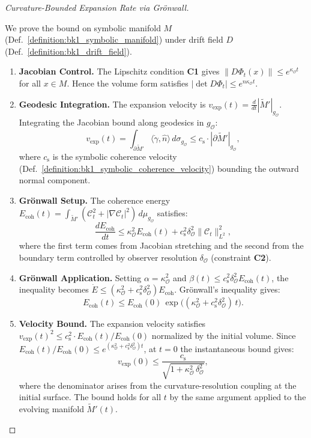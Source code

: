 \begin{proof}[Curvature-Bounded Expansion Rate via Grönwall]
\label{proof:bk4_bounded_expansion_under_observer_constrained_coherence}
\leavevmode

We prove the bound on symbolic manifold $M$
(Def.~\ref{definition:bk1_symbolic_manifold}) under drift field $D$
(Def.~\ref{definition:bk1_drift_field}).
\begin{enumerate}
\item \textbf{Jacobian Control.} The Lipschitz condition \textbf{C1} gives $\|D\Phi_t(x)\| \leq e^{\kappa_{\mathcal{O}} t}$ for all $x \in M$. Hence the volume form satisfies $|\det D\Phi_t| \leq e^{n\kappa_{\mathcal{O}} t}$.

\item \textbf{Geodesic Integration.} The expansion velocity is $v_{\text{exp}}(t) = \frac{d}{dt}|\widetilde{M}'|_{g_{\mathcal{O}}}$. Integrating the Jacobian bound along geodesics in $g_{\mathcal{O}}$:
\[
v_{\text{exp}}(t) = \int_{\partial\widetilde{M}'} \langle \dot\gamma, \hat n\rangle \, d\sigma_{g_{\mathcal{O}}} \leq c_{\text{s}} \cdot |\partial\widetilde{M}'|_{g_{\mathcal{O}}},
\]
where $c_{\text{s}}$ is the symbolic coherence velocity (Def.~\ref{definition:bk1_symbolic_coherence_velocity}) bounding the outward normal component.

\item \textbf{Grönwall Setup.} The coherence energy $E_{\text{coh}}(t) = \int_{\widetilde{M}'}\!(\mathcal{C}_t^{2}+|\nabla\mathcal{C}_t|^{2})\,d\mu_{g_{\mathcal{O}}}$ satisfies:
\[
\frac{dE_{\text{coh}}}{dt} \leq \kappa_{\mathcal{O}}^2 E_{\text{coh}}(t) + c_{\text{s}}^2 \delta_{\mathcal{O}}^2 \|\mathcal{C}_t\|_{L^2}^2,
\]
where the first term comes from Jacobian stretching and the second from the boundary term controlled by observer resolution $\delta_{\mathcal{O}}$ (constraint \textbf{C2}).

\item \textbf{Grönwall Application.} Setting $\alpha = \kappa_{\mathcal{O}}^2$ and $\beta(t) \leq c_{\text{s}}^2\delta_{\mathcal{O}}^2 E_{\text{coh}}(t)$, the inequality becomes $\dot E \leq (\kappa_{\mathcal{O}}^2 + c_{\text{s}}^2\delta_{\mathcal{O}}^2) E_{\text{coh}}$. Grönwall's inequality gives:
\[
E_{\text{coh}}(t) \leq E_{\text{coh}}(0)\,\exp\!\bigl((\kappa_{\mathcal{O}}^2 + c_{\text{s}}^2\delta_{\mathcal{O}}^2)\,t\bigr).
\]

\item \textbf{Velocity Bound.} The expansion velocity satisfies $v_{\text{exp}}(t)^2 \leq c_{\text{s}}^2 \cdot E_{\text{coh}}(t)/E_{\text{coh}}(0)$ normalized by the initial volume. Since $E_{\text{coh}}(t)/E_{\text{coh}}(0) \leq e^{(\kappa_{\mathcal{O}}^2+c_{\text{s}}^2\delta_{\mathcal{O}}^2)t}$, at $t=0$ the instantaneous bound gives:
\[
v_{\text{exp}}(0) \leq \frac{c_{\text{s}}}{\sqrt{1 + \kappa_{\mathcal{O}}^2\,\delta_{\mathcal{O}}^2}},
\]
where the denominator arises from the curvature-resolution coupling at the initial surface. The bound holds for all $t$ by the same argument applied to the evolving manifold $\widetilde{M}'(t)$. \qedhere
\end{enumerate}
\end{proof}

